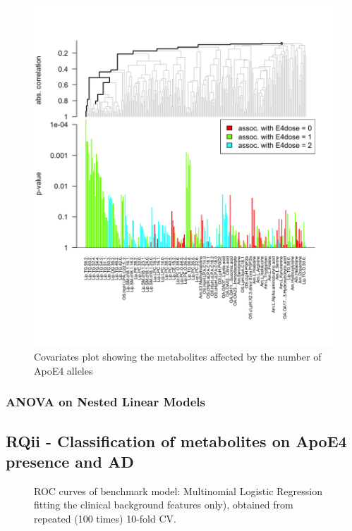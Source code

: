 \documentclass{amsart}
\theoremstyle{plain}
\begin{document}
\begin{figure}
    \includegraphics[width=\textwidth]{figures/gt2.png}
      \caption{Covariates plot showing the metabolites affected by the number of ApoE4 alleles}
    \label{gt2}
  \end{figure}

\subsubsection{ANOVA on Nested Linear Models}

\subsection{RQii - Classification of metabolites on ApoE4 presence and AD}

\begin{figure}
  
  \caption{ROC curves of benchmark model: Multinomial Logistic Regression fitting the clinical background features only), obtained from repeated (100 times) 10-fold CV.}
  \label{roc:bench}
\end{figure}
\end{document}
